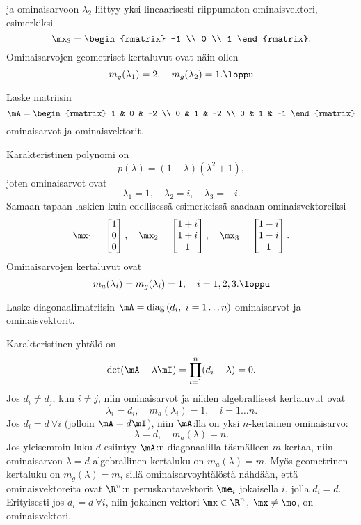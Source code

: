 ja ominaisarvoon $\lambda_2$ liittyy yksi lineaarisesti riippumaton ominaisvektori, esimerkiksi
\[
\mx_3=\begin{rmatrix} -1 \\ 0 \\ 1 \end{rmatrix}.
\]
Ominaisarvojen geometriset kertaluvut ovat näin ollen
\[
m_g(\lambda_1)=2,\quad m_g(\lambda_2)=1. \loppu
\]
\begin{Exa} \label{eig-ex2}
Laske matriisin
\[
\mA=\begin{rmatrix} 1 & 0 & -2 \\ 0 & 1 & -2 \\ 0 & 1 & -1 \end{rmatrix}
\]
ominaisarvot ja ominaisvektorit.
\end{Exa}
\ratk Karakteristinen polynomi on
\[
p(\lambda)=(1-\lambda)(\lambda^2+1),
\]
joten ominaisarvot ovat
\[
\lambda_1=1,\quad \lambda_2=i,\quad \lambda_3=-i.
\]
Samaan tapaan laskien kuin edellisessä esimerkeissä saadaan ominaisvektoreiksi
\[
\mx_1=\begin{bmatrix} 1 \\ 0 \\ 0 \end{bmatrix},\quad
\mx_2=\begin{bmatrix} 1+i \\ 1+i \\ 1 \end{bmatrix},\quad
\mx_3=\begin{bmatrix} 1-i \\ 1-i \\ 1 \end{bmatrix}.
\]
Ominaisarvojen kertaluvut ovat
\[
m_a(\lambda_i)=m_g(\lambda_i)=1,\quad i=1,2,3. \loppu
\]

\begin{Exa} \label{eig-ex3} Laske diagonaalimatriisin $\mA=\text{diag}\, (d_i, \ i=1\ldots n)$
ominaisarvot ja ominaisvektorit. 
\end{Exa}
\ratk Karakteristinen yhtälö on
\[
\det(\mA-\lambda\mI)=\prod_{i=1}^n (d_i-\lambda)=0.
\]
Jos $d_i\neq d_j$, kun $i\neq j$, niin ominaisarvot ja niiden algebrallisest kertaluvut ovat
\[
\lambda_i=d_i,\quad m_a(\lambda_i)=1,\quad i=1\ldots n.
\]
Jos $d_i=d \ \forall i$ (jolloin $\mA=d\mI$), niin $\mA$:lla on yksi $n$-kertainen ominaisarvo:
\[
\lambda=d,\quad m_a(\lambda)=n.
\]
Jos yleisemmin luku $d$ esiintyy $\mA$:n diagonaalilla täsmälleen $m$ kertaa, niin ominaisarvon
$\lambda=d$ algebrallinen kertaluku on $m_a(\lambda)=m$. Myös geometrinen kertaluku on 
$m_g(\lambda)=m$, sillä ominaisarvoyhtälöstä nähdään, että ominaisvektoreita ovat $\R^n$:n 
peruskantavektorit $\me_i$ jokaisella $i$, jolla $d_i=d$. Erityisesti jos $d_i=d \ \forall i$,
niin jokainen vektori $\mx\in\R^n$, $\mx\neq \mo$, on ominaisvektori. \loppu

